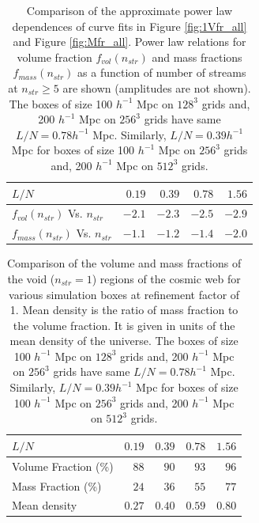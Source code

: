 \begin{table}
\centering
  \caption{Comparison of the approximate power law dependences of curve fits in Figure \ref{fig:1Vfr_all} and Figure \ref{fig:Mfr_all}. Power law relations for volume fraction $f_{vol}(n_{str})$ and mass fractions $f_{mass} (n_{str}) $ as a function of number of streams at $n_{str} \geq 5$ are shown (amplitudes are not shown). The boxes of size 100 $h^{-1}$ Mpc on  $128^{3}$ grids and, 200 $h^{-1}$ Mpc on  $256^{3}$ grids have same  $L/N = 0.78 h^{-1}$ Mpc. Similarly, $L/N = 0.39 h^{-1}$ Mpc for boxes of size 100 $h^{-1}$ Mpc on  $256^{3}$ grids and, 200 $h^{-1}$ Mpc on  $512^{3}$ grids.}
\begin{tabular}{|l|r|r|r|r|}
\hline
$L/N$                & $0.19$ & $0.39$& $0.78$ & $1.56$  \\ \hline
$f_{vol} (n_{str}) $ Vs. $n_{str}$                 & $-2.1$   & $-2.3$    & $-2.5$      & $-2.9$  \\ \hline
$f_{mass} (n_{str}) $   Vs. $n_{str}$            & $-1.1$   & $-1.2$   & $-1.4$       & $-2.0$     \\ \hline
\end{tabular}
 \label{tab:Compare_Slopes}
\end{table}



 \begin{table}
 \centering
  \caption{Comparison of the volume and mass fractions of the void ($n_{str} = 1$) regions of the cosmic web for various simulation boxes at refinement factor of 1. Mean density is the ratio of mass fraction to the volume fraction. It is given in units of the mean density of the universe. The boxes of size 100 $h^{-1}$ Mpc on  $128^{3}$ grids and, 200 $h^{-1}$ Mpc on  $256^{3}$ grids have same  $L/N = 0.78 h^{-1}$ Mpc. Similarly, $L/N = 0.39 h^{-1}$ Mpc for boxes of size 100 $h^{-1}$ Mpc on  $256^{3}$ grids and, 200 $h^{-1}$ Mpc on  $512^{3}$ grids.}
\begin{tabular}{|l|r|r|r|r|}
\hline
$L/N$                & $0.19$ & $0.39$& $0.78$ & $1.56$  \\ \hline
Volume Fraction (\%)                 & $88$   & $90$    & $93$      & $96$  \\ \hline
Mass Fraction   (\%)               & $24$   & $36$   & $55$       & $77$     \\ \hline
Mean density                    & $0.27$ & $0.40$    & $0.59$        & $0.80$   \\ \hline
\end{tabular}
 \label{tab:Compare_LN}
\end{table}


